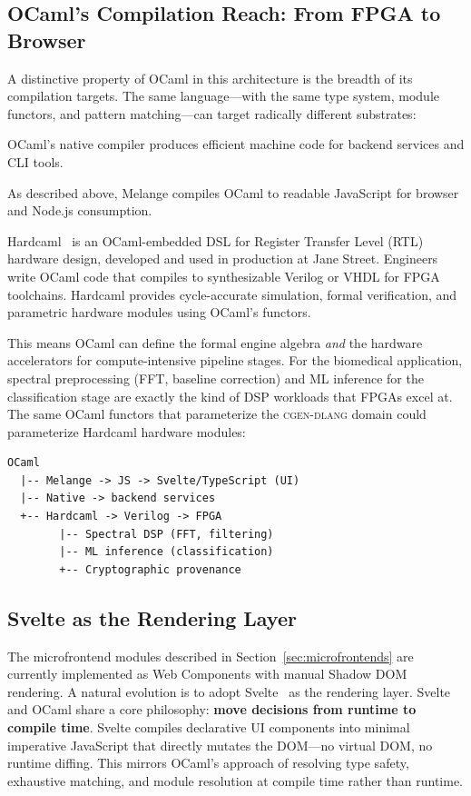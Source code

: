\documentclass[11pt,letterpaper]{article}
\newcommand{\cgen}{\textsc{cgen-dlang}}
\begin{document}
\subsection{OCaml's Compilation Reach: From FPGA to Browser}

A distinctive property of OCaml in this architecture is the breadth of its compilation targets. The same language---with the same type system, module functors, and pattern matching---can target radically different substrates:

\begin{description}[leftmargin=*,style=nextline]
  \item[Native code] OCaml's native compiler produces efficient machine code for backend services and CLI tools.
  \item[JavaScript (Melange)] As described above, Melange compiles OCaml to readable JavaScript for browser and Node.js consumption.
  \item[FPGA hardware (Hardcaml)] Hardcaml~\cite{hardcaml2023} is an OCaml-embedded DSL for Register Transfer Level (RTL) hardware design, developed and used in production at Jane Street. Engineers write OCaml code that compiles to synthesizable Verilog or VHDL for FPGA toolchains. Hardcaml provides cycle-accurate simulation, formal verification, and parametric hardware modules using OCaml's functors.
\end{description}

This means OCaml can define the formal engine algebra \textit{and} the hardware accelerators for compute-intensive pipeline stages. For the biomedical application, spectral preprocessing (FFT, baseline correction) and ML inference for the classification stage are exactly the kind of DSP workloads that FPGAs excel at. The same OCaml functors that parameterize the \cgen{} domain could parameterize Hardcaml hardware modules:

\begin{verbatim}
OCaml
  |-- Melange -> JS -> Svelte/TypeScript (UI)
  |-- Native -> backend services
  +-- Hardcaml -> Verilog -> FPGA
        |-- Spectral DSP (FFT, filtering)
        |-- ML inference (classification)
        +-- Cryptographic provenance
\end{verbatim}

\subsection{Svelte as the Rendering Layer}

The microfrontend modules described in Section~\ref{sec:microfrontends} are currently implemented as Web Components with manual Shadow DOM rendering. A natural evolution is to adopt Svelte~\cite{svelte2019} as the rendering layer. Svelte and OCaml share a core philosophy: \textbf{move decisions from runtime to compile time}. Svelte compiles declarative UI components into minimal imperative JavaScript that directly mutates the DOM---no virtual DOM, no runtime diffing. This mirrors OCaml's approach of resolving type safety, exhaustive matching, and module resolution at compile time rather than runtime.
\end{document}
